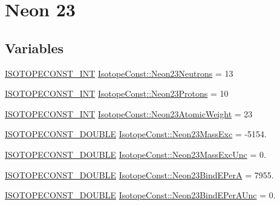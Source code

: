 \hypertarget{group___isotope_const-_neon-_ne23}{}\section{Neon 23}
\label{group___isotope_const-_neon-_ne23}
\subsection*{Variables}
\begin{DoxyCompactItemize}
\item 
\mbox{\hyperlink{group___isotope_const-_macros_ga5f18360b3e99483a35c32d789e62621c}{I\+S\+O\+T\+O\+P\+E\+C\+O\+N\+S\+T\+\_\+\+I\+NT}} \mbox{\hyperlink{group___isotope_const-_neon-_ne23_gad3a426a30ee41c4b3f859c8c8966a3b5}{Isotope\+Const\+::\+Neon23\+Neutrons}} = 13
\item 
\mbox{\hyperlink{group___isotope_const-_macros_ga5f18360b3e99483a35c32d789e62621c}{I\+S\+O\+T\+O\+P\+E\+C\+O\+N\+S\+T\+\_\+\+I\+NT}} \mbox{\hyperlink{group___isotope_const-_neon-_ne23_ga6f8b3da7b653e18292eed55ba111965c}{Isotope\+Const\+::\+Neon23\+Protons}} = 10
\item 
\mbox{\hyperlink{group___isotope_const-_macros_ga5f18360b3e99483a35c32d789e62621c}{I\+S\+O\+T\+O\+P\+E\+C\+O\+N\+S\+T\+\_\+\+I\+NT}} \mbox{\hyperlink{group___isotope_const-_neon-_ne23_ga30799a0fb17b03b58c32dd3d79da5d92}{Isotope\+Const\+::\+Neon23\+Atomic\+Weight}} = 23
\item 
\mbox{\hyperlink{group___isotope_const-_macros_ga8f45a7272ce02c0b4c65c44636ed719a}{I\+S\+O\+T\+O\+P\+E\+C\+O\+N\+S\+T\+\_\+\+D\+O\+U\+B\+LE}} \mbox{\hyperlink{group___isotope_const-_neon-_ne23_ga7439cd6e5dcec9e70ff50f2ac8e2a491}{Isotope\+Const\+::\+Neon23\+Mass\+Exc}} = -\/5154.
\item 
\mbox{\hyperlink{group___isotope_const-_macros_ga8f45a7272ce02c0b4c65c44636ed719a}{I\+S\+O\+T\+O\+P\+E\+C\+O\+N\+S\+T\+\_\+\+D\+O\+U\+B\+LE}} \mbox{\hyperlink{group___isotope_const-_neon-_ne23_ga266e22a6d297330d9c5ab2d5cd67c79d}{Isotope\+Const\+::\+Neon23\+Mass\+Exc\+Unc}} = 0.
\item 
\mbox{\hyperlink{group___isotope_const-_macros_ga8f45a7272ce02c0b4c65c44636ed719a}{I\+S\+O\+T\+O\+P\+E\+C\+O\+N\+S\+T\+\_\+\+D\+O\+U\+B\+LE}} \mbox{\hyperlink{group___isotope_const-_neon-_ne23_gad5d1d032d45e44d1914bddc97a1ed6c6}{Isotope\+Const\+::\+Neon23\+Bind\+E\+PerA}} = 7955.
\item 
\mbox{\hyperlink{group___isotope_const-_macros_ga8f45a7272ce02c0b4c65c44636ed719a}{I\+S\+O\+T\+O\+P\+E\+C\+O\+N\+S\+T\+\_\+\+D\+O\+U\+B\+LE}} \mbox{\hyperlink{group___isotope_const-_neon-_ne23_ga2f49f3443c538377e347f46403ce2169}{Isotope\+Const\+::\+Neon23\+Bind\+E\+Per\+A\+Unc}} = 0.

\end{DoxyCompactItemize}
